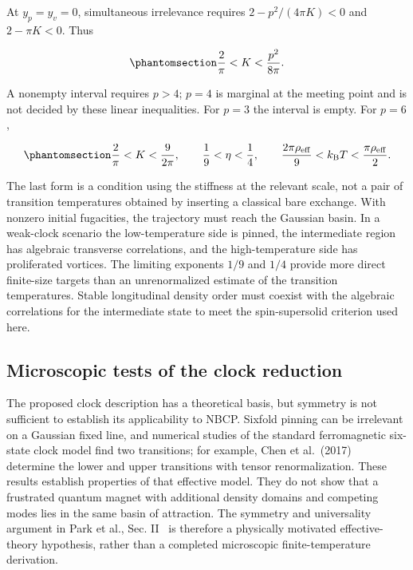 At \(y_p=y_v=0\), simultaneous irrelevance requires \(2-p^2/(4\pi K)<0\)
and \(2-\pi K<0\). Thus

\begin{equation}\phantomsection\label{eq-nbcp-clock-window}{
\frac{2}{\pi}<K<\frac{p^2}{8\pi}.
}\end{equation}

A nonempty interval requires \(p>4\); \(p=4\) is marginal at the meeting
point and is not decided by these linear inequalities. For \(p=3\) the
interval is empty. For \(p=6\),

\begin{equation}\phantomsection\label{eq-nbcp-clock-sixfold-window}{
\frac{2}{\pi}<K<\frac{9}{2\pi},\qquad
\frac19<\eta<\frac14,\qquad
\frac{2\pi\rho_{\rm eff}}9<k_{\rm B}T<\frac{\pi\rho_{\rm eff}}2.
}\end{equation}

The last form is a condition using the stiffness at the relevant scale,
not a pair of transition temperatures obtained by inserting a classical
bare exchange. With nonzero initial fugacities, the trajectory must
reach the Gaussian basin. In a weak-clock scenario the low-temperature
side is pinned, the intermediate region has algebraic transverse
correlations, and the high-temperature side has proliferated vortices.
The limiting exponents \(1/9\) and \(1/4\) provide more direct
finite-size targets than an unrenormalized estimate of the transition
temperatures. Stable longitudinal density order must coexist with the
algebraic correlations for the intermediate state to meet the
spin-supersolid criterion used here.

\subsection{Microscopic tests of the clock
reduction}\label{sec-nbcp-clock-matching-tests}

The proposed clock description has a theoretical basis, but symmetry is
not sufficient to establish its applicability to NBCP. Sixfold pinning
can be irrelevant on a Gaussian fixed line, and numerical studies of the
standard ferromagnetic six-state clock model find two transitions; for
example, Chen et al.~(2017)~\cite{chen2017}
determine the lower and upper transitions with tensor renormalization.
These results establish properties of that effective model. They do not
show that a frustrated quantum magnet with additional density domains
and competing modes lies in the same basin of attraction. The symmetry
and universality argument in
Park et al., Sec. II~\cite{park2026} is
therefore a physically motivated effective-theory hypothesis, rather
than a completed microscopic finite-temperature derivation.

